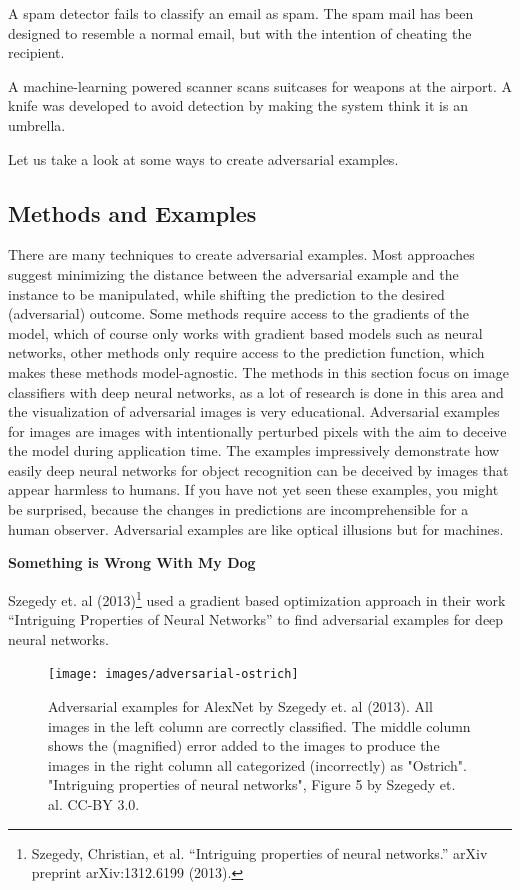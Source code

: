 \documentclass[12pt,]{krantz}
\begin{document}
A spam detector fails to classify an email as spam. The spam mail has
been designed to resemble a normal email, but with the intention of
cheating the recipient.

A machine-learning powered scanner scans suitcases for weapons at the
airport. A knife was developed to avoid detection by making the system
think it is an umbrella.

Let us take a look at some ways to create adversarial examples.

\subsection{Methods and Examples}\label{methods-and-examples}

There are many techniques to create adversarial examples. Most
approaches suggest minimizing the distance between the adversarial
example and the instance to be manipulated, while shifting the
prediction to the desired (adversarial) outcome. Some methods require
access to the gradients of the model, which of course only works with
gradient based models such as neural networks, other methods only
require access to the prediction function, which makes these methods
model-agnostic. The methods in this section focus on image classifiers
with deep neural networks, as a lot of research is done in this area and
the visualization of adversarial images is very educational. Adversarial
examples for images are images with intentionally perturbed pixels with
the aim to deceive the model during application time. The examples
impressively demonstrate how easily deep neural networks for object
recognition can be deceived by images that appear harmless to humans. If
you have not yet seen these examples, you might be surprised, because
the changes in predictions are incomprehensible for a human observer.
Adversarial examples are like optical illusions but for machines.

\textbf{Something is Wrong With My Dog}

Szegedy et. al (2013)\footnote{Szegedy, Christian, et al. ``Intriguing
  properties of neural networks.'' arXiv preprint arXiv:1312.6199
  (2013).} used a gradient based optimization approach in their work
``Intriguing Properties of Neural Networks'' to find adversarial
examples for deep neural networks.

\begin{figure}

{\centering \texttt{[image: images/adversarial-ostrich]} 

}

\caption{Adversarial examples for AlexNet by Szegedy et. al (2013). All images in the left column are correctly classified. The middle column shows the (magnified) error added to the images to produce the images in the right column all categorized (incorrectly) as "Ostrich". "Intriguing properties of neural networks", Figure 5 by Szegedy et. al. CC-BY 3.0.}\label{fig:adversarial-ostrich}
\end{figure}
\end{document}
